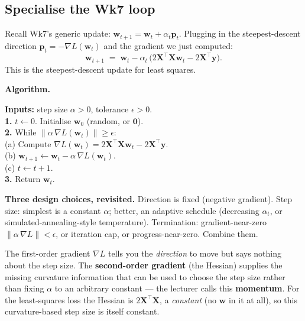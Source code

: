 \documentclass[11pt, a4paper]{article}
\begin{document}
\subsection{Specialise the Wk7 loop}

Recall Wk7's generic update: $\mathbf{w}_{t+1} = \mathbf{w}_t + \alpha_t \mathbf{p}_t$. Plugging in the steepest-descent direction $\mathbf{p}_t = -\nabla L(\mathbf{w}_t)$ and the gradient we just computed:
\[
\boxed{\;\mathbf{w}_{t+1} \;=\; \mathbf{w}_t - \alpha_t\,\big(2\mathbf{X}^\top\mathbf{X}\mathbf{w}_t - 2\mathbf{X}^\top\mathbf{y}\big).\;}
\]
This is the steepest-descent update for least squares.

\textbf{Algorithm.}

\begin{exbox}
\textbf{Inputs:} step size $\alpha > 0$, tolerance $\epsilon > 0$.\\[0.2em]
\textbf{1.} $t \leftarrow 0$. Initialise $\mathbf{w}_0$ (random, or $\mathbf{0}$).\\
\textbf{2.} While $\|\alpha\,\nabla L(\mathbf{w}_t)\| \ge \epsilon$:\\
\quad\quad (a) Compute $\nabla L(\mathbf{w}_t) = 2\mathbf{X}^\top\mathbf{X}\mathbf{w}_t - 2\mathbf{X}^\top\mathbf{y}$.\\
\quad\quad (b) $\mathbf{w}_{t+1} \leftarrow \mathbf{w}_t - \alpha\,\nabla L(\mathbf{w}_t)$.\\
\quad\quad (c) $t \leftarrow t+1$.\\
\textbf{3.} Return $\mathbf{w}_t$.
\end{exbox}

\textbf{Three design choices, revisited.} Direction is fixed (negative gradient). Step size: simplest is a constant $\alpha$; better, an adaptive schedule (decreasing $\alpha_t$, or simulated-annealing-style temperature). Termination: gradient-near-zero $\|\alpha\,\nabla L\| < \epsilon$, or iteration cap, or progress-near-zero. Combine them.

The first-order gradient $\nabla L$ tells you the \emph{direction} to move but says nothing about the step size. The \textbf{second-order gradient} (the Hessian) supplies the missing curvature information that can be used to choose the step size rather than fixing $\alpha$ to an arbitrary constant — the lecturer calls this \textbf{momentum}. For the least-squares loss the Hessian is $2\mathbf{X}^\top\mathbf{X}$, a \emph{constant} (no $\mathbf{w}$ in it at all), so this curvature-based step size is itself constant.
\end{document}
